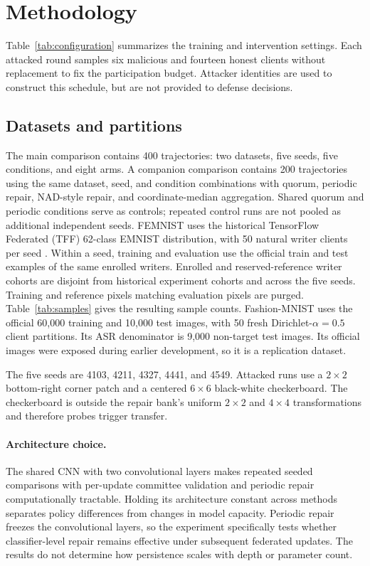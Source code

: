 \documentclass[sigconf,review,anonymous]{acmart}
\begin{document}
\section{Methodology}

Table~\ref{tab:configuration} summarizes the training and intervention settings. Each attacked round samples six malicious and fourteen honest clients without replacement to fix the participation budget. Attacker identities are used to construct this schedule, but are not provided to defense decisions.
\subsection{Datasets and partitions}
The main comparison contains 400 trajectories: two datasets, five seeds, five conditions, and eight arms. A companion comparison contains 200 trajectories using the same dataset, seed, and condition combinations with quorum, periodic repair, NAD-style repair, and coordinate-median aggregation. Shared quorum and periodic conditions serve as controls; repeated control runs are not pooled as additional independent seeds. FEMNIST uses the historical TensorFlow Federated (TFF) 62-class EMNIST distribution, with 50 natural writer clients per seed \cite{tffemnist}. Within a seed, training and evaluation use the official train and test examples of the same enrolled writers. Enrolled and reserved-reference writer cohorts are disjoint from historical experiment cohorts and across the five seeds. Training and reference pixels matching evaluation pixels are purged. Table~\ref{tab:samples} gives the resulting sample counts. Fashion-MNIST \cite{xiao2017fashion} uses the official 60,000 training and 10,000 test images, with 50 fresh Dirichlet-$\alpha=0.5$ client partitions. Its ASR denominator is 9,000 non-target test images. Its official images were exposed during earlier development, so it is a replication dataset.

The five seeds are 4103, 4211, 4327, 4441, and 4549. Attacked runs use a $2\times2$ bottom-right corner patch and a centered $6\times6$ black-white checkerboard. The checkerboard is outside the repair bank's uniform $2\times2$ and $4\times4$ transformations and therefore probes trigger transfer.



\paragraph{Architecture choice.}
The shared CNN with two convolutional layers makes repeated seeded comparisons with per-update committee validation and periodic repair computationally tractable. Holding its architecture constant across methods separates policy differences from changes in model capacity. Periodic repair freezes the convolutional layers, so the experiment specifically tests whether classifier-level repair remains effective under subsequent federated updates. The results do not determine how persistence scales with depth or parameter count.
\end{document}

